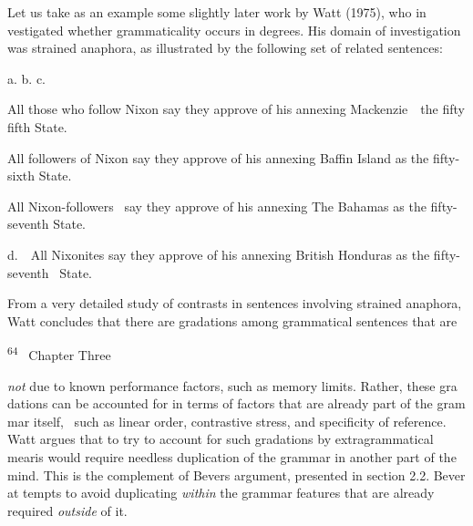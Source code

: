 \begin{styleStandard}
Let us take as an example some slightly later work by Watt (1975), who in\- vestigated whether grammaticality occurs in degrees. His domain of investigation was strained anaphora, as illustrated by the following set of related sentences:
\end{styleStandard}


\begin{multicols}{2}
\setcounter{listWWNumliileveli}{2}
\begin{listWWNumliileveli}
\item 
\begin{styleStandard}
a. b. c.
\end{styleStandard}


\end{listWWNumliileveli}
\begin{styleStandard}
All those who follow Nixon say they approve of his annexing Mackenzie\ \ the fifty fifth State.
\end{styleStandard}


\begin{styleStandard}
All followers of Nixon say they approve of his annexing Baffin Island as the fifty-sixth State.
\end{styleStandard}


\begin{styleStandard}
All Nixon-followers \ say they approve of his annexing The Bahamas as the fifty-seventh State.
\end{styleStandard}


\end{multicols}
\begin{styleStandard}
d.\ \ All Nixonites say they approve of his annexing British Honduras as the fifty-seventh \ State.
\end{styleStandard}


\begin{styleStandard}
From a very detailed study of contrasts in sentences involving strained anaphora, Watt concludes that there are gradations among grammatical sentences that are
\end{styleStandard}


\clearpage\setcounter{page}{1}\begin{styleStandard}
\textsuperscript{64\ \ }Chapter Three
\end{styleStandard}


\begin{styleStandard}
\textit{not}\textit{ }due to known performance factors, such as memory limits. Rather, these gra\- dations can be accounted for in terms of factors that are already part of the gram\- mar itself, \ such as linear order, contrastive stress, and specificity of reference. Watt argues that to try to account for such gradations by extragrammatical mearis would require needless duplication of the grammar in another part of the mind. This is the complement of Bever{\textquotesingle}s argument, presented in section 2.2. Bever at\- tempts to avoid duplicating \textit{within}\textit{ }the grammar features that are already required \textit{outside}\textit{ }of it.
\end{styleStandard}


